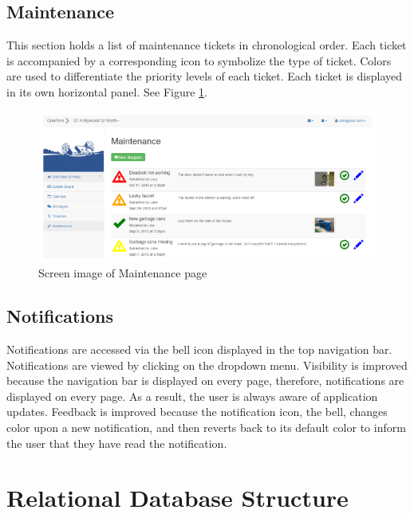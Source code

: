 \documentclass[12pt]{article}
\begin{document}
\subsection{Maintenance}
This section holds a list of maintenance tickets in chronological order. Each ticket is accompanied by a corresponding icon to symbolize the type of ticket. Colors are used to differentiate the priority levels of each ticket. Each ticket is displayed in its own horizontal panel. See Figure \ref{fig:maintenance}.

\begin{figure}
\centering
\includegraphics[width=\textwidth]{maintenance}
\caption{Screen image of Maintenance page}
\label{fig:maintenance}
\end{figure}

\subsection{Notifications}
Notifications are accessed via the bell icon displayed in the top navigation bar. Notifications are viewed by clicking on the dropdown menu. Visibility is improved because the navigation bar is displayed on every page, therefore, notifications are displayed on every page. As a result, the user is always aware of application updates. Feedback is improved because the notification icon, the bell, changes color upon a new notification, and then reverts back to its default color to inform the user that they have read the notification.

\section{Relational Database Structure}
\end{document}
